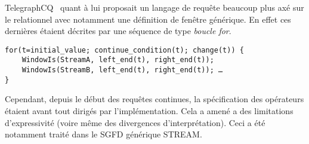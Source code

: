 TelegraphCQ~\cite{Chandrasekaran:telegraphcq} quant à lui proposait un langage de requête beaucoup plus axé sur le relationnel avec notamment une définition de fenêtre générique. En effet ces dernières étaient décrites par une séquence de type \textit{boucle for}.
\begin{center}
\begin{minipage}[c]{0.75\textwidth}
\begin{verbatim}
for(t=initial_value; continue_condition(t); change(t)) {
    WindowIs(StreamA, left_end(t), right_end(t));
    WindowIs(StreamB, left_end(t), right_end(t)); …
}
\end{verbatim}
\end{minipage}
\end{center}

Cependant, depuis le début des requêtes continues, la spécification des opérateurs étaient avant tout dirigés par l'implémentation. Cela a amené a des limitations d'expressivité (voire même des divergences d'interprétation). Ceci a été notamment traité dans le SGFD générique STREAM.

